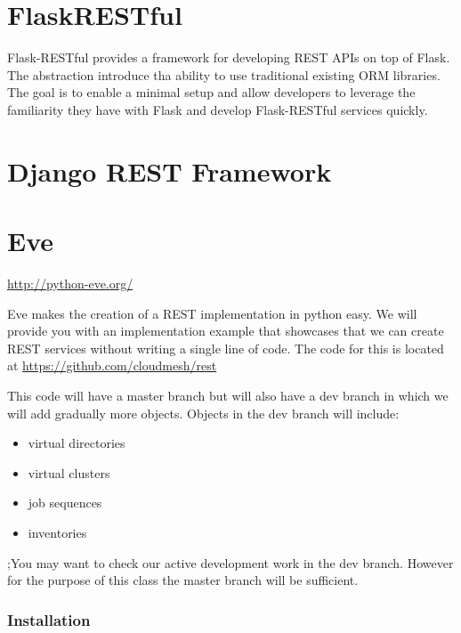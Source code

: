\section{FlaskRESTful}

Flask-RESTful provides a framework for developing REST APIs on top of
Flask. The abstraction introduce tha ability to use traditional existing
ORM libraries. The goal is to enable a minimal setup and allow
developers to leverage the familiarity they have with Flask and
develop Flask-RESTful services quickly.


\section{Django REST Framework}


\section{Eve}

\url{http://python-eve.org/}

Eve makes the creation of a REST implementation in python easy.  We
will provide you with an implementation example that showcases that we
can create REST services without writing a single line of code. The
code for this is located at \url{https://github.com/cloudmesh/rest}

This code will have a master branch but will also have a dev branch in
which we will add gradually more objects. Objects in the dev branch will
include:

\begin{itemize}
\tightlist
\item
 virtual directories
\item
 virtual clusters
\item
 job sequences
\item
 inventories
\end{itemize}

;You may want to check our active development work in the dev branch.
However for the purpose of this class the master branch will be
sufficient.

\subsubsection{Installation}\label{installation}

